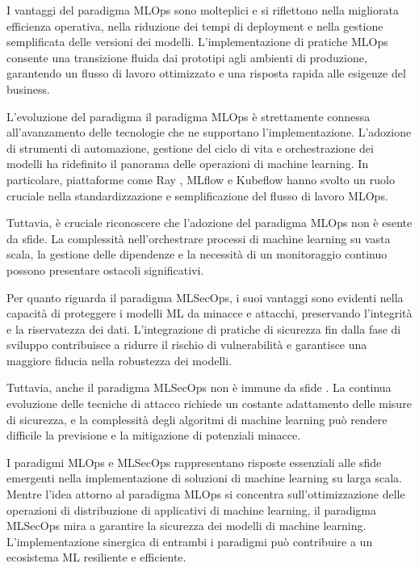 I vantaggi del paradigma MLOps sono molteplici e si riflettono nella migliorata efficienza operativa, nella riduzione dei tempi di deployment e nella gestione semplificata delle versioni dei modelli. L'implementazione di pratiche MLOps consente una transizione fluida dai prototipi agli ambienti di produzione, garantendo un flusso di lavoro ottimizzato e una risposta rapida alle esigenze del business.

L'evoluzione del paradigma il paradigma MLOps è strettamente connessa all'avanzamento delle tecnologie che ne supportano l'implementazione. L'adozione di strumenti di automazione, gestione del ciclo di vita e orchestrazione dei modelli ha ridefinito il panorama delle operazioni di machine learning. In particolare, piattaforme come Ray \cite{ray}, MLflow \cite{mlflow} e Kubeflow \cite{kubeflow} hanno svolto un ruolo cruciale nella standardizzazione e semplificazione del flusso di lavoro MLOps.

Tuttavia, è cruciale riconoscere che l'adozione del paradigma MLOps non è esente da sfide. La complessità nell'orchestrare processi di machine learning su vasta scala, la gestione delle dipendenze e la necessità di un monitoraggio continuo possono presentare ostacoli significativi.

Per quanto riguarda il paradigma MLSecOps, i suoi vantaggi sono evidenti nella capacità di proteggere i modelli ML da minacce e attacchi, preservando l'integrità e la riservatezza dei dati. L'integrazione di pratiche di sicurezza fin dalla fase di sviluppo contribuisce a ridurre il rischio di vulnerabilità e garantisce una maggiore fiducia nella robustezza dei modelli.

Tuttavia, anche il paradigma MLSecOps non è immune da sfide \cite{adv_ml_2}. La continua evoluzione delle tecniche di attacco richiede un costante adattamento delle misure di sicurezza, e la complessità degli algoritmi di machine learning può rendere difficile la previsione e la mitigazione di potenziali minacce.

I paradigmi MLOps e MLSecOps rappresentano risposte essenziali alle sfide emergenti nella implementazione di soluzioni di machine learning su larga scala. Mentre l'idea attorno al paradigma MLOps si concentra sull'ottimizzazione delle operazioni di distribuzione di applicativi di machine learning, il paradigma MLSecOps mira a garantire la sicurezza dei modelli di machine learning. L'implementazione sinergica di entrambi i paradigmi può contribuire a un ecosistema ML resiliente e efficiente.